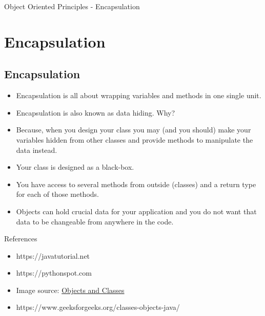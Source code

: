 \documentclass[10pt]{beamer}
\begin{document}
%					
%					
%					
	\begin{frame}{Object Oriented Principles - Encapsulation}
		\section{Encapsulation}
		\subsection{Encapsulation}
		\begin{itemize}
			\item Encapsulation is all about wrapping variables and methods in one single unit.
			\item Encapsulation is also known as data hiding. Why? 
			\item Because, when you design your class you may (and you should) make your variables hidden from other classes and provide methods to manipulate the data instead. 
			\item Your class is designed as a black-box. 
			\item You have access to several methods from outside (classes) and a return type for each of those methods. 
			\item Objects can hold crucial data for your application and you do not want that data to be changeable from anywhere in the code.
		\end{itemize}
	\end{frame}
	\begin{frame}
			
	\end{frame}
	\begin{frame}{References}
		\begin{itemize}
			\item https://javatutorial.net
			\item https://pythonspot.com
			\item Image source: 
			\href{https://www.google.de/search?q=objects+and+classes+in+java&source=lnms&tbm=isch&sa=X&ved=0ahUKEwjaifOUnLbdAhWCJFAKHfriDX4Q\_AUICygC&biw=1301&bih=678#imgrc=OMVi4MfR9G1omM:}{Objects and Classes} 	
			\item https://www.geeksforgeeks.org/classes-objects-java/
		\end{itemize}
	\end{frame}
\end{document}
